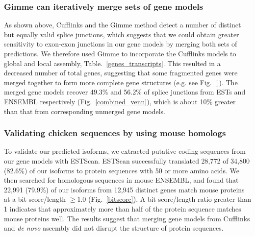 \documentclass[10pt]{article}
\begin{document}
\subsubsection*{Gimme can iteratively merge sets of gene models}


As shown above, Cufflinks and the Gimme method detect a number of distinct but
equally valid splice junctions, which suggests that we could obtain greater
sensitivity to exon-exon junctions in our gene models by merging both sets of
predictions.  We therefore used Gimme to incorporate the Cufflinks models to
global and local assembly, Table.~\ref{genes_transcripts}.  This resulted in a
decreased number of total genes, suggesting that some fragmented genes were
merged together to form more complete gene structures (e.g. see
Fig.~\ref{}). The merged gene models recover 49.3\% and 56.2\% of
splice junctions from ESTs and ENSEMBL respectively
(Fig.~\ref{combined_venn}), which is about 10\% greater than that from
corresponding unmerged gene models.


\subsubsection*{Validating chicken sequences by using mouse homologs}

To validate our predicted isoforms, we extracted putative coding sequences from
our gene models with ESTScan\cite{Iseli:1999vd}.  ESTScan successfully
translated 28,772 of 34,800 (82.6\%) of our isoforms to protein sequences with
50 or more amino acids.  We then searched for homologous sequences in mouse
ENSEMBL, and found that 22,991 (79.9\%) of our isoforms from 12,945 distinct
genes match mouse proteins at a bit-score/length $\ge1.0$
(Fig.~\ref{bitscore}).  A bit-score/length ratio greater than 1 indicates that
approximately more than half of the protein sequence matches mouse proteins
well. The results suggest that merging gene models from Cufflinks and {\em de
novo} aseembly did not disrupt the structure of protein sequences.

\end{document}
